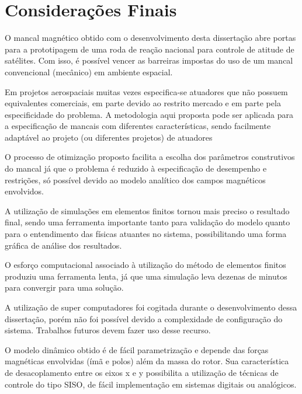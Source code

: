 \pagestyle{empty}
	\cleardoublepage
\pagestyle{fancy}

\chapter{Considerações Finais} \label{Cap:Consideracoes:Finais}

O mancal magnético obtido com o desenvolvimento desta dissertação abre portas para a prototipagem de uma roda de reação nacional para controle de atitude de satélites. Com isso, é possível vencer as barreiras impostas do uso de um mancal convencional (mecânico) em ambiente espacial.

Em projetos aerospaciais muitas vezes especifica-se atuadores que não possuem equivalentes comerciais, em parte devido ao restrito mercado e em parte pela especificidade do problema. A metodologia aqui proposta pode ser aplicada para a especificação de mancais com diferentes características, sendo facilmente adaptável ao projeto (ou diferentes projetos) de atuadores


O processo de otimização proposto facilita a escolha dos parâmetros construtivos do mancal já que o problema é reduzido à especificação de desempenho e restrições, só possível devido ao modelo analítico dos campos magnéticos envolvidos.

A utilização de simulações em elementos finitos tornou mais preciso o resultado final, sendo uma ferramenta importante tanto para validação do modelo quanto para o entendimento das físicas atuantes no sistema, possibilitando uma forma gráfica de análise dos resultados. 

O esforço computacional associado à utilização do método de elementos finitos produziu uma ferramenta lenta, já que uma simulação leva dezenas de minutos para convergir para uma solução.

A utilização de super computadores foi cogitada durante o desenvolvimento dessa dissertação, porém não foi possível devido a complexidade de configuração do sistema. Trabalhos futuros devem fazer uso desse recurso.

O modelo dinâmico obtido é de fácil parametrização e depende das forças magnéticas envolvidas (ímã e polos) além da massa do rotor. Sua característica de desacoplamento entre os eixos x e y possibilita a utilização de técnicas de controle do tipo SISO, de fácil implementação em sistemas digitais ou analógicos.

